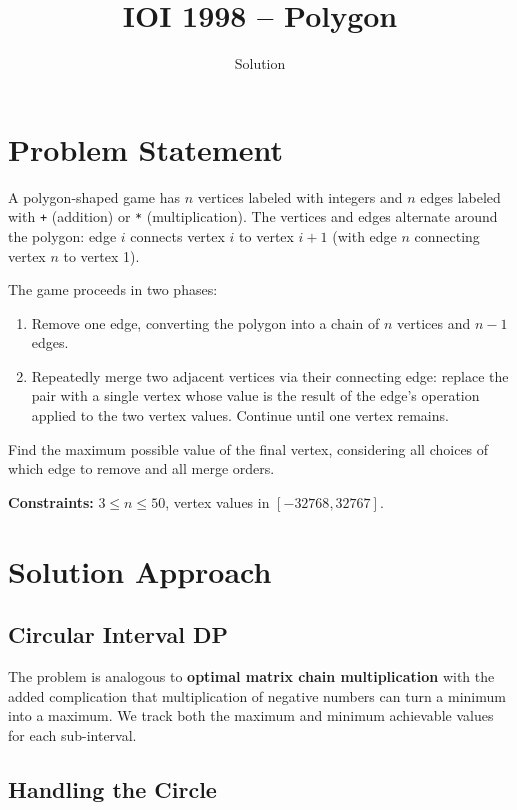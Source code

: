 \documentclass[11pt,a4paper]{article}
\title{IOI 1998 -- Polygon}
\author{Solution}
\date{}
\begin{document}
\maketitle

\section{Problem Statement}

A polygon-shaped game has $n$ vertices labeled with integers and $n$ edges labeled
with \texttt{+} (addition) or \texttt{*} (multiplication). The vertices and edges
alternate around the polygon: edge $i$ connects vertex $i$ to vertex $i+1$
(with edge $n$ connecting vertex $n$ to vertex 1).

The game proceeds in two phases:
\begin{enumerate}
  \item Remove one edge, converting the polygon into a chain of $n$ vertices and $n-1$ edges.
  \item Repeatedly merge two adjacent vertices via their connecting edge: replace
        the pair with a single vertex whose value is the result of the edge's operation
        applied to the two vertex values. Continue until one vertex remains.
\end{enumerate}

Find the maximum possible value of the final vertex, considering all choices of
which edge to remove and all merge orders.

\medskip
\noindent\textbf{Constraints:} $3 \le n \le 50$, vertex values in $[-32768, 32767]$.

\section{Solution Approach}

\subsection{Circular Interval DP}

The problem is analogous to \textbf{optimal matrix chain multiplication} with the
added complication that multiplication of negative numbers can turn a minimum into
a maximum. We track both the maximum and minimum achievable values for each sub-interval.

\subsection{Handling the Circle}
\end{document}
